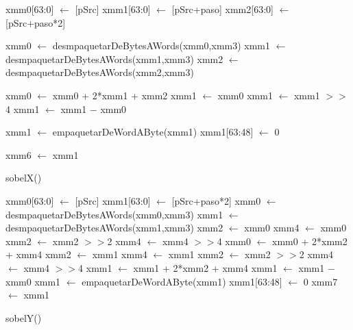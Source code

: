 \documentclass[11pt, a4paper]{article}
\begin{document}
   \begin{algorithm}[H]
     \SetLine
    	xmm0[63:0] $\leftarrow$ [pSrc]\;
			xmm1[63:0] $\leftarrow$ [pSrc+paso]\;
			xmm2[63:0] $\leftarrow$ [pSrc+paso*2]\;
			
			xmm0 $\leftarrow$ desmpaquetarDeBytesAWords(xmm0,xmm3)\;
			xmm1 $\leftarrow$ desmpaquetarDeBytesAWords(xmm1,xmm3)\;
			xmm2 $\leftarrow$ desmpaquetarDeBytesAWords(xmm2,xmm3)\;
			
			xmm0 $\leftarrow$ xmm0 + 2*xmm1 + xmm2\;
			xmm1 $\leftarrow$ xmm0\;
			xmm1 $\leftarrow$ xmm1 $>>$4
			xmm1 $\leftarrow$ xmm1 $-$ xmm0\;
			
			xmm1 $\leftarrow$ empaquetarDeWordAByte(xmm1)\;
			xmm1[63:48] $\leftarrow$ 0\;
			
			xmm6 $\leftarrow$ xmm1\;
			
			
			
     \caption{sobelX()}
   \end{algorithm}



   \begin{algorithm}[H]
     \SetLine
    	xmm0[63:0] $\leftarrow$ [pSrc]\;
			xmm1[63:0] $\leftarrow$ [pSrc+paso*2]\;
			xmm0 $\leftarrow$ desmpaquetarDeBytesAWords(xmm0,xmm3)\;
			xmm1 $\leftarrow$ desmpaquetarDeBytesAWords(xmm1,xmm3)\;
			xmm2 $\leftarrow$ xmm0\;
			xmm4 $\leftarrow$ xmm0\;
			xmm2 $\leftarrow$ xmm2 $>>$2\;
			xmm4 $\leftarrow$ xmm4 $>>$4\;
			xmm0 $\leftarrow$ xmm0 + 2*xmm2 + xmm4\;
			xmm2 $\leftarrow$ xmm1\;
			xmm4 $\leftarrow$ xmm1\;
			xmm2 $\leftarrow$ xmm2 $>>$2\;
			xmm4 $\leftarrow$ xmm4 $>>$4\;
			xmm1 $\leftarrow$ xmm1 + 2*xmm2 + xmm4\;
			xmm1 $\leftarrow$ xmm1 $-$ xmm0\;
			xmm1 $\leftarrow$ empaquetarDeWordAByte(xmm1)\;
			xmm1[63:48] $\leftarrow$ 0\;		
			xmm7 $\leftarrow$ xmm1\;
			
     \caption{sobelY()}
   \end{algorithm}
\end{document}
